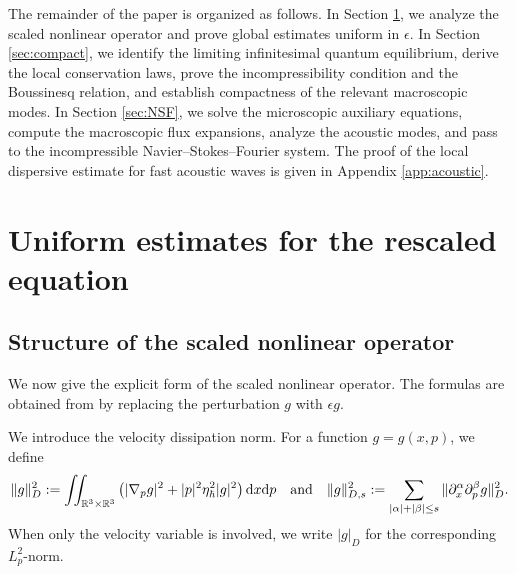 \documentclass[10pt,reqno]{amsart}
\numberwithin{equation}{section}
\newcommand{\lt}{\left}
\newcommand{\rt}{\right}
\newcommand{\R}{\mathbb R}
\newcommand{\intrr}{\iint_{\R^3 \times \R^3}}
\newcommand{\rdx}{\textnormal{d}x}
\newcommand{\rdp}{\textnormal{d}p}
\begin{document}
 
%
%
%
%
%
%
%
%
%
%

The remainder of the paper is organized as follows. In Section \ref{sec:scaled-uniform}, we analyze the scaled nonlinear operator and prove global estimates uniform in $\epsilon$. In Section \ref{sec:compact}, we identify the limiting infinitesimal quantum equilibrium, derive the local conservation laws, prove the incompressibility condition and the Boussinesq relation, and establish compactness of the relevant macroscopic modes. In Section \ref{sec:NSF}, we solve the microscopic auxiliary equations, compute the macroscopic flux expansions, analyze the acoustic modes, and pass to the incompressible Navier--Stokes--Fourier system. The proof of the local dispersive estimate for fast acoustic waves is given in Appendix \ref{app:acoustic}.


%
%
%
%
%
%
%
%
%
%
 
  

\section{Uniform estimates for the rescaled equation} \label{sec:scaled-uniform}
%
%
%
%
%
%
%
%
%
%
 
\subsection{Structure of the scaled nonlinear operator}\label{ssec:scaled-nl}

We now give the explicit form of the scaled nonlinear operator. The formulas are obtained from \cite[Lemma 3.1 and Proposition 3.1]{CHHpre} by replacing the perturbation $g$ with $\epsilon g$. 

We introduce the velocity dissipation norm. For a function $g=g(x,p)$, we define
\[
\|g\|_{D}^2:=\intrr \lt(|\nabla_p g|^2+|p|^2\eta_\hbar^2|g|^2\rt) \rdx\rdp \quad \text{and} \quad \|g\|_{D,s}^2:=\sum_{|\alpha|+|\beta|\le s}\|\partial_x^\alpha\partial_p^\beta g\|_{D}^2.
\]
When only the velocity variable is involved, we write $|g|_D$ for the corresponding $L^2_p$-norm.
\end{document}
